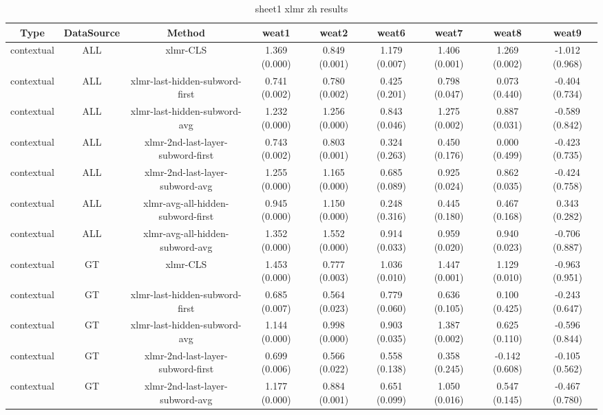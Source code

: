 \begin{sidewaystable}[htb]
    \centering
    \caption{sheet1 xlmr zh results}
    \label{appendix_tab:sheet1_xlmr_zh_results}
    \small
    \begin{tabular}{@{}ccccccccc@{}}
        \toprule
        Type & DataSource & Method & weat1 & weat2 & weat6 & weat7 & weat8 & weat9 \\
        \midrule
        contextual & ALL & xlmr-CLS & 1.369 (0.000) & 0.849 (0.001) & 1.179 (0.007) & 1.406 (0.001) & 1.269 (0.002) & -1.012 (0.968) \\
        contextual & ALL & xlmr-last-hidden-subword-first & 0.741 (0.002) & 0.780 (0.002) & 0.425 (0.201) & 0.798 (0.047) & 0.073 (0.440) & -0.404 (0.734) \\
        contextual & ALL & xlmr-last-hidden-subword-avg & 1.232 (0.000) & 1.256 (0.000) & 0.843 (0.046) & 1.275 (0.002) & 0.887 (0.031) & -0.589 (0.842) \\
        contextual & ALL & xlmr-2nd-last-layer-subword-first & 0.743 (0.002) & 0.803 (0.001) & 0.324 (0.263) & 0.450 (0.176) & 0.000 (0.499) & -0.423 (0.735) \\
        contextual & ALL & xlmr-2nd-last-layer-subword-avg & 1.255 (0.000) & 1.165 (0.000) & 0.685 (0.089) & 0.925 (0.024) & 0.862 (0.035) & -0.424 (0.758) \\
        contextual & ALL & xlmr-avg-all-hidden-subword-first & 0.945 (0.000) & 1.150 (0.000) & 0.248 (0.316) & 0.445 (0.180) & 0.467 (0.168) & 0.343 (0.282) \\
        contextual & ALL & xlmr-avg-all-hidden-subword-avg & 1.352 (0.000) & 1.552 (0.000) & 0.914 (0.033) & 0.959 (0.020) & 0.940 (0.023) & -0.706 (0.887) \\
        contextual & GT & xlmr-CLS & 1.453 (0.000) & 0.777 (0.003) & 1.036 (0.010) & 1.447 (0.001) & 1.129 (0.010) & -0.963 (0.951) \\
        contextual & GT & xlmr-last-hidden-subword-first & 0.685 (0.007) & 0.564 (0.023) & 0.779 (0.060) & 0.636 (0.105) & 0.100 (0.425) & -0.243 (0.647) \\
        contextual & GT & xlmr-last-hidden-subword-avg & 1.144 (0.000) & 0.998 (0.000) & 0.903 (0.035) & 1.387 (0.002) & 0.625 (0.110) & -0.596 (0.844) \\
        contextual & GT & xlmr-2nd-last-layer-subword-first & 0.699 (0.006) & 0.566 (0.022) & 0.558 (0.138) & 0.358 (0.245) & -0.142 (0.608) & -0.105 (0.562) \\
        contextual & GT & xlmr-2nd-last-layer-subword-avg & 1.177 (0.000) & 0.884 (0.001) & 0.651 (0.099) & 1.050 (0.016) & 0.547 (0.145) & -0.467 (0.780) \\

\end{tabular}
\end{sidewaystable}
